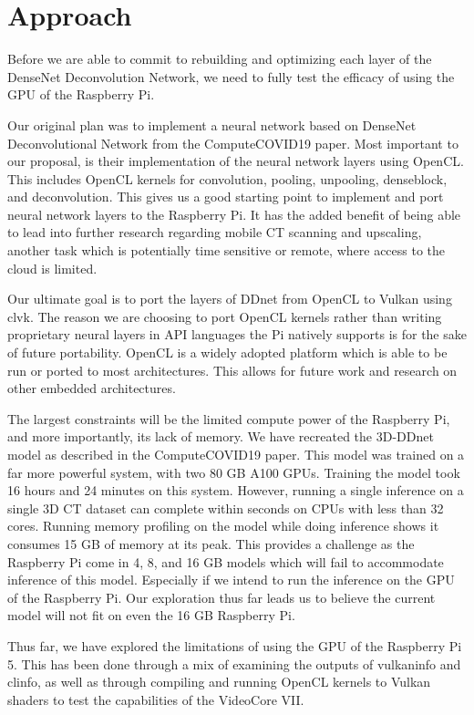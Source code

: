 \documentclass[conference]{IEEEtran}
\begin{document}
 \section{Approach}

 Before we are able to commit to rebuilding and optimizing each layer of the DenseNet Deconvolution Network,
 we need to fully test the efficacy of using the GPU of the Raspberry Pi.

 Our original plan was to implement a neural network based on DenseNet Deconvolutional Network from the ComputeCOVID19 paper.
 Most important to our proposal, is their implementation of the neural network layers using OpenCL. This includes 
 OpenCL kernels for convolution, pooling, unpooling, denseblock, and deconvolution. This gives us a good 
 starting point to implement and port neural network layers to the Raspberry Pi. It has the added benefit 
 of being able to lead into further research regarding mobile CT scanning and upscaling, another task which 
 is potentially time sensitive or remote, where access to the cloud is limited. 

 Our ultimate goal is to port the layers of DDnet from OpenCL to Vulkan using clvk. 
 The reason we are choosing to port OpenCL kernels rather than writing proprietary 
 neural layers in API languages the Pi natively supports is for the sake of future 
 portability. OpenCL is a widely adopted platform which is able to be run or ported to 
 most architectures. This allows for future work and research on other embedded architectures.

 The largest constraints will be the limited compute power of the Raspberry Pi, and more
 importantly, its lack of memory. We have recreated the 3D-DDnet model as described in the ComputeCOVID19 paper. 
 This model was trained on a far more powerful system, with two 80 GB A100 GPUs. Training the model took 16 hours 
 and 24 minutes on this system. However, running a single inference on a single 3D CT dataset can complete 
 within seconds on CPUs with less than 32 cores. Running memory profiling on the model while doing inference 
 shows it consumes 15 GB of memory at its peak. This provides a challenge as the Raspberry Pi come in 
 4, 8, and 16 GB models which will fail to accommodate inference of this model. Especially if we intend to run 
 the inference on the GPU of the Raspberry Pi. Our exploration thus far leads us to believe the current model 
 will not fit on even the 16 GB Raspberry Pi.

 Thus far, we have explored the limitations of using the GPU of the Raspberry Pi 5. 
 This has been done through a mix of examining the outputs of vulkaninfo and clinfo, 
 as well as through compiling and running OpenCL kernels to Vulkan shaders to test the 
 capabilities of the VideoCore VII. 
 
\end{document}
